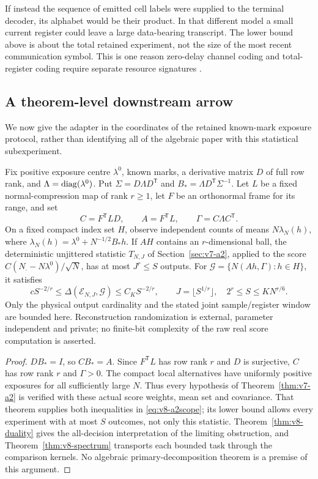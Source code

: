If instead the sequence of emitted cell labels were supplied to the
terminal decoder, its alphabet would be their product. In that different
model a small current register could leave a large data-bearing
transcript. The lower bound above is about the total retained experiment,
not the size of the most recent communication symbol. This is one reason
zero-delay channel coding and total-register coding require separate
resource signatures \cite{LinderYuksel2014,WoodLinderYuksel2017}.

\subsection{A theorem-level downstream arrow}
We now give the adapter in the coordinates of the retained known-mark
exposure protocol, rather than identifying all of the algebraic paper
with this statistical subexperiment.
\begin{corollary}\label{cor:v8-a2adapter}
Fix positive exposure centre $\lambda^0$, known marks, a derivative
matrix $D$ of full row rank, and $\Lambda=\operatorname{diag}(\lambda^0)$. Put
$\Sigma=D\Lambda D^{\mathsf T}$ and
$B_*=\Lambda D^{\mathsf T}\Sigma^{-1}$. Let $L$ be a fixed
normal-compression map of rank $r\ge1$, let $F$ be an orthonormal
frame for its range, and set
\[
 C=F^{\mathsf T}LD,\qquad A=F^{\mathsf T}L,\qquad
 \Gamma=C\Lambda C^{\mathsf T}.
\]
On a fixed compact index set $H$, observe independent counts of
means $N\lambda_N(h)$, where
$\lambda_N(h)=\lambda^0+N^{-1/2}B_*h$.
If $AH$ contains an $r$-dimensional ball, the deterministic unjittered
statistic $T_{N,J}$ of Section~\ref{sec:v7-a2}, applied to the score
$C(N_\cdot-N\lambda^0)/\sqrt N$, has at most $J^r\le S$ outputs. For
$\mathcal G=\{N(Ah,\Gamma):h\in H\}$, it satisfies
\begin{equation}
 c S^{-2/r}\le\Delta(\mathcal E_{N,J},\mathcal G)
             \le C_K S^{-2/r},\qquad
 J=\lfloor S^{1/r}\rfloor,\quad
 2^r\le S\le K N^{r/6}.                 \label{eq:v8-a2scope}
\end{equation}
Only the physical output cardinality and the stated joint sample/register
window are bounded here. Reconstruction randomization is external,
parameter independent and private; no finite-bit complexity of the raw
real score computation is asserted.
\end{corollary}
\begin{proof}
$DB_*=I$, so $CB_*=A$. Since $F^{\mathsf T}L$ has row rank $r$
and $D$ is surjective, $C$ has row rank $r$ and $\Gamma>0$.
The compact local alternatives have uniformly positive exposures for
all sufficiently large $N$. Thus every hypothesis of
Theorem~\ref{thm:v7-a2} is verified with these actual score weights,
mean set and covariance. That theorem supplies both inequalities in
\eqref{eq:v8-a2scope}; its lower bound allows every experiment with at
most $S$ outcomes, not only this statistic. Theorem~\ref{thm:v8-duality}
gives the all-decision interpretation of the limiting obstruction, and
Theorem~\ref{thm:v8-spectrum} transports each bounded task through the
comparison kernels. No algebraic primary-decomposition theorem is a
premise of this argument.
\end{proof}
